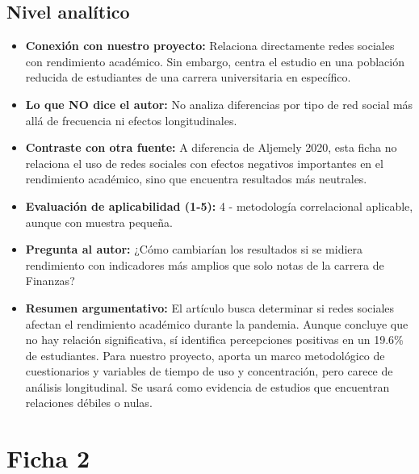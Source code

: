 \documentclass[12pt]{article}
\begin{document}
\subsection*{Nivel analítico}
\begin{itemize}
  \item \textbf{Conexión con nuestro proyecto:} Relaciona directamente redes sociales con rendimiento académico. Sin embargo, centra el estudio en una población reducida de estudiantes de una carrera universitaria en específico.
  \item \textbf{Lo que NO dice el autor:} No analiza diferencias por tipo de red social más allá de frecuencia ni efectos longitudinales.
  \item \textbf{Contraste con otra fuente:} A diferencia de Aljemely 2020, esta ficha no relaciona el uso de redes sociales con efectos negativos importantes en el rendimiento académico, sino que encuentra resultados más neutrales.
  \item \textbf{Evaluación de aplicabilidad (1-5):} 4 - metodología correlacional aplicable, aunque con muestra pequeña.
  \item \textbf{Pregunta al autor:} ¿Cómo cambiarían los resultados si se midiera rendimiento con indicadores más amplios que solo notas de la carrera de Finanzas?
  \item \textbf{Resumen argumentativo:} El artículo busca determinar si redes sociales afectan el rendimiento académico durante la pandemia. Aunque concluye que no hay relación significativa, sí identifica percepciones positivas en un 19.6\% de estudiantes. Para nuestro proyecto, aporta un marco metodológico de cuestionarios y variables de tiempo de uso y concentración, pero carece de análisis longitudinal. Se usará como evidencia de estudios que encuentran relaciones débiles o nulas.
\end{itemize}

\section*{Ficha 2}
\end{document}
